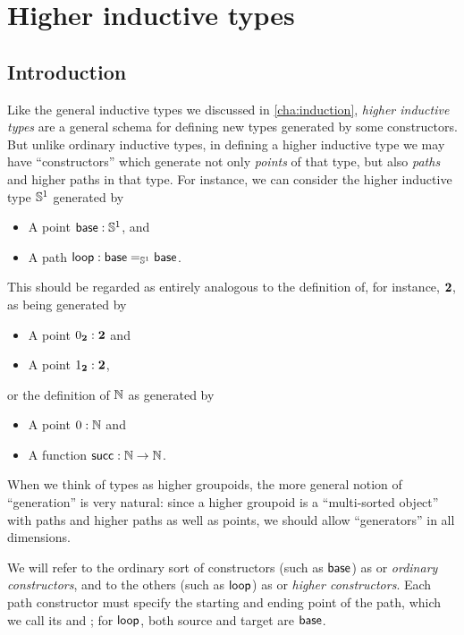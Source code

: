 \chapter{Higher inductive types}
\label{cha:hits}

%
%
%

\section{Introduction}
\label{sec:intro-hits}


Like the general inductive types we discussed in \autoref{cha:induction}, \emph{higher inductive types} are a general schema for defining new types generated by some constructors.
But unlike ordinary inductive types, in defining a higher inductive type we may have ``constructors'' which generate not only \emph{points} of that type, but also \emph{paths} and higher paths in that type.
%
%
For instance, we can consider the higher inductive type $\Sn^1$ generated by
\begin{itemize}
\item A point $\base:\Sn^1$, and
\item A path $\lloop : {\id[\Sn^1]\base\base}$.
\end{itemize}
This should be regarded as entirely analogous to the definition of, for instance, $\bool$, as being generated by
\begin{itemize}
\item A point $\bfalse:\bool$ and
\item A point $\btrue:\bool$,
\end{itemize}
or the definition of $\nat$ as generated by
\begin{itemize}
\item A point $0:\nat$ and
\item A function $\suc:\nat\to\nat$.
\end{itemize}
When we think of types as higher groupoids, the more general notion of ``generation'' is very natural:
since a higher groupoid is a ``multi-sorted object'' with paths and higher paths as well as points, we should allow ``generators'' in all dimensions.

We will refer to the ordinary sort of constructors (such as $\base$) as 
%
%
or \emph{ordinary constructors}, and to the others (such as $\lloop$) as 
%
%
or \emph{higher constructors}.
Each path constructor must specify the starting and ending point of the path, which we call its 
%
and ;
%
for $\lloop$, both source and target are $\base$.

